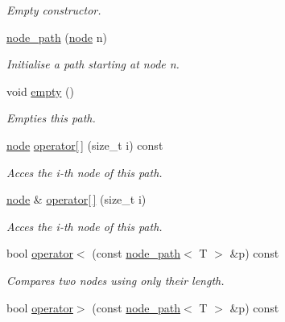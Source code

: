 \begin{DoxyCompactItemize}
\begin{DoxyCompactList}\small\item\em Empty constructor. \end{DoxyCompactList}\item 
\hyperlink{classlgraph_1_1node__path_ae998efffa65b591d68fbab35f2218120}{node\-\_\-path} (\hyperlink{namespacelgraph_a397169dd66adf725210a30fb7251773e}{node} n)
\begin{DoxyCompactList}\small\item\em Initialise a path starting at node {\itshape n}. \end{DoxyCompactList}\item 
void \hyperlink{classlgraph_1_1node__path_a8e11ffbd295bea9d10ebdd2180d68732}{empty} ()
\begin{DoxyCompactList}\small\item\em Empties this path. \end{DoxyCompactList}\item 
\hyperlink{namespacelgraph_a397169dd66adf725210a30fb7251773e}{node} \hyperlink{classlgraph_1_1node__path_acc3ba2cfb06dfdbb5d9c8aa94b4b7fcf}{operator\mbox{[}$\,$\mbox{]}} (size\-\_\-t i) const 
\begin{DoxyCompactList}\small\item\em Acces the {\itshape i-\/th} node of this path. \end{DoxyCompactList}\item 
\hyperlink{namespacelgraph_a397169dd66adf725210a30fb7251773e}{node} \& \hyperlink{classlgraph_1_1node__path_ad7cf4262b891ee24938fb0b91ac3cfd8}{operator\mbox{[}$\,$\mbox{]}} (size\-\_\-t i)
\begin{DoxyCompactList}\small\item\em Acces the {\itshape i-\/th} node of this path. \end{DoxyCompactList}\item 
\hypertarget{classlgraph_1_1node__path_a001eaa630299c4bafecd8b728f63774b}{bool \hyperlink{classlgraph_1_1node__path_a001eaa630299c4bafecd8b728f63774b}{operator$<$} (const \hyperlink{classlgraph_1_1node__path}{node\-\_\-path}$<$ T $>$ \&p) const }\label{classlgraph_1_1node__path_a001eaa630299c4bafecd8b728f63774b}

\begin{DoxyCompactList}\small\item\em Compares two nodes using only their length. \end{DoxyCompactList}\item 
\hypertarget{classlgraph_1_1node__path_a7fa63f08caae37ef26bdb80df614c8c5}{bool \hyperlink{classlgraph_1_1node__path_a7fa63f08caae37ef26bdb80df614c8c5}{operator$>$} (const \hyperlink{classlgraph_1_1node__path}{node\-\_\-path}$<$ T $>$ \&p) const }\label{classlgraph_1_1node__path_a7fa63f08caae37ef26bdb80df614c8c5}


\end{DoxyCompactItemize}
